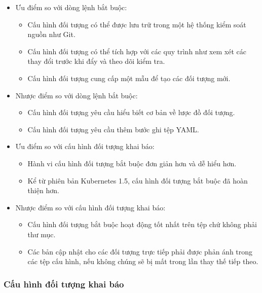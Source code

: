 \documentclass[12pt,a4paper]{report}
\begin{document}
	\begin{itemize}
		\item Ưu điểm so với dòng lệnh bắt buộc:
		\begin{itemize}
			\item Cấu hình đối tượng có thể được lưu trữ trong một hệ thống kiểm soát nguồn như Git.
			\item Cấu hình đối tượng có thể tích hợp với các quy trình như xem xét các thay đổi trước khi đẩy và theo dõi kiểm tra.
			\item Cấu hình đối tượng cung cấp một mẫu để tạo các đối tượng mới.
		\end{itemize}
		\item Nhược điểm so với dòng lệnh bắt buộc:
		\begin{itemize}
			\item Cấu hình đối tượng yêu cầu hiểu biết cơ bản về lược đồ đối tượng.
			\item Cấu hình đối tượng yêu cầu thêm bước ghi tệp YAML.
		\end{itemize}
		\item Ưu điểm so với cấu hình đối tượng khai báo:
		\begin{itemize}
			\item Hành vi cấu hình đối tượng bắt buộc đơn giản hơn và dễ hiểu hơn.
			\item Kể từ phiên bản Kubernetes 1.5, cấu hình đối tượng bắt buộc đã hoàn thiện hơn.
		\end{itemize}
		\item Nhược điểm so với cấu hình đối tượng khai báo:
		\begin{itemize}
			\item Cấu hình đối tượng bắt buộc hoạt động tốt nhất trên tệp chứ không phải thư mục.
			\item Các bản cập nhật cho các đối tượng trực tiếp phải được phản ánh trong các tệp cấu hình, nếu không chúng sẽ bị mất trong lần thay thế tiếp theo.
		\end{itemize}
	\end{itemize}
	
	\subsubsection{Cấu hình đối tượng khai báo}
	
	
\end{document}
